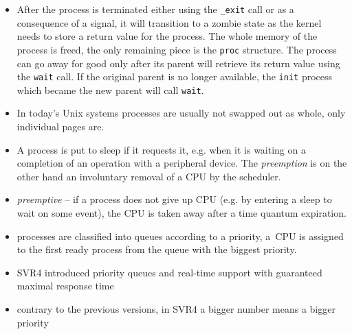 

\begin{slide}
\begin{center}

\end{center}
\end{slide}

\begin{itemize}
\item After the process is terminated either using the \texttt{\_exit} call
or as a consequence of a signal, it will transition to a zombie state as the
kernel needs to store a return value for the process. The whole memory
of the process is freed, the only remaining piece is the \texttt{proc}
structure. The process can go away for good only after its parent will
retrieve its return value using the \texttt{wait} call.
If the original parent is no longer available, the
\texttt{init} process which became the new parent will call \texttt{wait}.
\item In today's Unix systems processes are usually not swapped out as whole,
only individual pages are.
\item A process is put to sleep if it requests it, e.g. when it is waiting on a
completion of an operation with a peripheral device. The \emph{preemption} is on
the other hand an involuntary removal of a CPU by the scheduler.
\end{itemize}


\begin{slide}
\begin{itemize}
\item \emph{preemptive} -- if a process does not give up CPU
(e.g. by entering a sleep to wait on some event), the CPU is taken away
after a time quantum expiration.
\item processes are classified into queues according to a priority,
a~CPU is assigned to the first ready process from the queue with the biggest
priority.
\item SVR4 introduced priority queues and real-time support with guaranteed
maximal response time
\item contrary to the previous versions, in SVR4 a bigger number means a bigger
priority
\end{itemize}
\end{slide}

